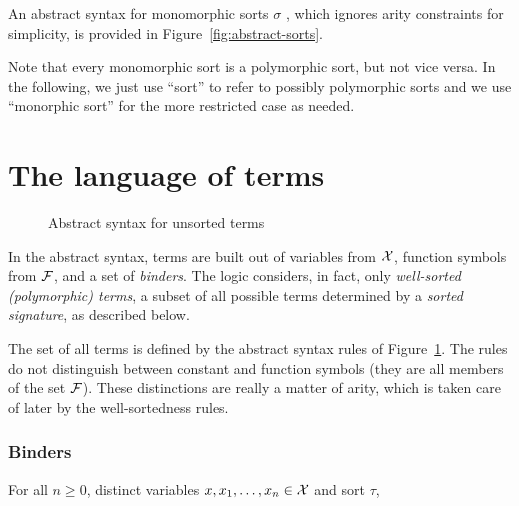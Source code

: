 An abstract syntax for monomorphic sorts $\sigma$ ,
which ignores arity constraints for simplicity, 
is provided in Figure~\ref{fig:abstract-sorts}.
\begin{newver}
Note that every monomorphic sort is a polymorphic sort, but not vice versa.
In the following, we just use ``sort'' to refer to possibly polymorphic sorts
and we use ``monorphic sort'' for the more restricted case as needed.
\end{newver}

%



\section{The language of terms} \label{sec:language}

\begin{figure}
\terms
\caption{Abstract syntax for unsorted terms}
\label{fig:abstract-terms}
\end{figure}

In the abstract syntax,
terms are built out of variables from $\mathcal{X}$, 
function symbols from $\mathcal{F}$, 
and a set of \emph{binders}.
%
The logic considers, in fact, only \emph{well-sorted (polymorphic) terms},
a subset of all possible terms determined 
by a \emph{sorted signature}, as described below.

The set of all terms is defined by the abstract syntax rules of 
Figure~\ref{fig:abstract-terms}.
The rules do not distinguish between constant and function symbols
(they are all members of the set $\mathcal{F}$). 
These distinctions are really a matter of arity, 
which is taken care of later by the well-sortedness rules.

\subsubsection{Binders}

For all $n \geq 0$,
distinct variables $x, x_1, \ldots, x_n \in \mathcal{X}$ and sort $\tau$,

